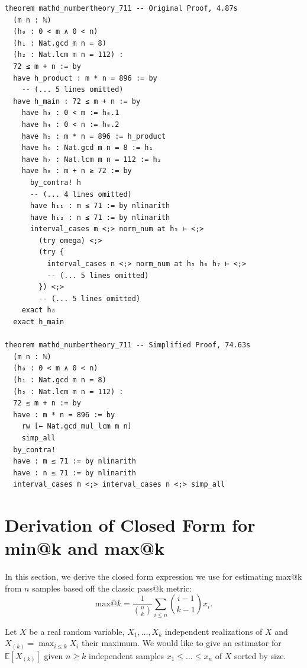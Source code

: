 \begin{tcolorbox}[colback=lightblue, boxrule=0pt, arc=5pt, outer arc=5pt, after skip=10pt plus 2pt]
\begin{lstlisting}[caption={Example of Slowdown after Simplification (orig: 4.9s, new: 74.6s)},label={lst:minif2f-slowdown-2}, captionpos=t, language=lean, breaklines=true, style=mystyle]
theorem mathd_numbertheory_711 -- Original Proof, 4.87s
  (m n : ℕ)
  (h₀ : 0 < m ∧ 0 < n)
  (h₁ : Nat.gcd m n = 8)
  (h₂ : Nat.lcm m n = 112) :
  72 ≤ m + n := by
  have h_product : m * n = 896 := by
    -- (... 5 lines omitted)
  have h_main : 72 ≤ m + n := by
    have h₃ : 0 < m := h₀.1
    have h₄ : 0 < n := h₀.2
    have h₅ : m * n = 896 := h_product
    have h₆ : Nat.gcd m n = 8 := h₁
    have h₇ : Nat.lcm m n = 112 := h₂
    have h₈ : m + n ≥ 72 := by
      by_contra! h
      -- (... 4 lines omitted)
      have h₁₁ : m ≤ 71 := by nlinarith
      have h₁₂ : n ≤ 71 := by nlinarith
      interval_cases m <;> norm_num at h₅ ⊢ <;>
        (try omega) <;>
        (try {
          interval_cases n <;> norm_num at h₅ h₆ h₇ ⊢ <;>
          -- (... 5 lines omitted)
        }) <;>
        -- (... 5 lines omitted)
    exact h₈
  exact h_main

theorem mathd_numbertheory_711 -- Simplified Proof, 74.63s
  (m n : ℕ)
  (h₀ : 0 < m ∧ 0 < n)
  (h₁ : Nat.gcd m n = 8)
  (h₂ : Nat.lcm m n = 112) :
  72 ≤ m + n := by
  have : m * n = 896 := by
    rw [← Nat.gcd_mul_lcm m n]
    simp_all
  by_contra!
  have : m ≤ 71 := by nlinarith
  have : n ≤ 71 := by nlinarith
  interval_cases m <;> interval_cases n <;> simp_all
\end{lstlisting}
\end{tcolorbox}

\newpage
\section{Derivation of Closed Form for min@k and max@k}
\label{app:estimation}
In this section, we derive the closed form expression we use for estimating max@k from $n$ samples based off the classic pass@k metric:
\[\text{max@}k = \frac{1}{\binom{n}{k}}\sum_{i \leq n} \binom{i-1}{k-1} x_i. \]

Let $X$ be a real random variable, $X_1, \ldots, X_k$ independent realizations of $X$ and $X_{(k)} = \max_{i \leq k} X_i$ their maximum. We would like to give an estimator for $\mathbb{E}[X_{(k)}]$ given $n \geq k$ independent samples $x_1 \leq \ldots \leq x_n$ of $X$ sorted by size.

